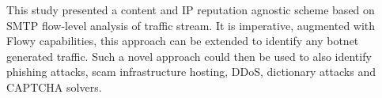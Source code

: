 This study presented a content and \ac{IP} reputation agnostic scheme based on \ac{SMTP} flow-level analysis of traffic stream. It is imperative, augmented with Flowy capabilities, this approach can be extended to identify any botnet generated traffic.  Such a novel approach could then be used to also identify phishing attacks, scam infrastructure hosting, \ac{DDoS}, dictionary attacks and \ac{CAPTCHA} solvers.
